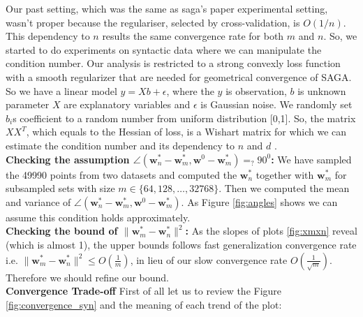 \documentclass[11pt, a4paper, reqno, twoside]{scrartcl}
\theoremstyle{style}
\newcommand{\wv}{\bm{w}}
\newcommand{\0}{\mathbf{0}} %
\begin{document}
Our past setting, which was the same as saga's paper experimental setting,
wasn't proper because the regulariser, selected by cross-validation, is
$O(1/n)$. This dependency to $n$ results the same convergence rate for both $m$
and $n$. So, we started to do experiments on syntactic data where we can
manipulate the condition number. Our analysis is restricted to a strong convexly
loss function with a smooth regularizer that are needed for geometrical convergence of SAGA.
So we have a linear model $y = X b + \epsilon$, where the $y$ is
observation, $b$ is unknown parameter $X$ are explanatory variables and
$\epsilon$ is Gaussian noise. We randomly set $b_i$s coefficient to a random
number from uniform distribution [0,1]. So, the matrix $X X^T$, which equals to
the Hessian of loss, is a Wishart matrix for which we can estimate the condition
number and its dependency to $n$ and $d$ \cite{edelman1988eigenvalues}. 
\\
\textbf{Checking the assumption $\angle(\wv_n^* - \wv_m^*,\wv^0- \wv_m^*) =_{?}
    90^0$:} 
 We have sampled the 49990 points from two datasets and computed the $\wv_n^*$
 together with $\wv_m^*$ for subsampled sets with size $m \in \{ 64, 128,
 \ldots, 32768\}$. Then we computed the mean and variance of $\angle(\wv_n^* -
 \wv_m^*,\wv^0- \wv_m^*)$. As Figure \ref{fig:angles} shows we can assume this
 condition holds approximately. 
 \\
 \textbf{Checking the bound of $\| \wv_m^* - \wv_n^* \|^2$:} 
  As the slopes of plots \ref{fig:xmxn} reveal (which is almost 1), the upper
  bounds follows fast generalization convergence rate \cite{bousquet2008tradeoffs} i.e. $\| \wv_m^*
  - \wv_n^* \|^2 \leq O(\frac{1}{m})$, in lieu of our slow convergence rate
  $O(\frac{1}{\sqrt{m}})$. Therefore we should refine our bound.\\ 
  \textbf{Convergence Trade-off } 
  First of all let us to review the Figure \ref{fig:convergence_syn} and the
  meaning of each trend of the plot: 
\end{document}
